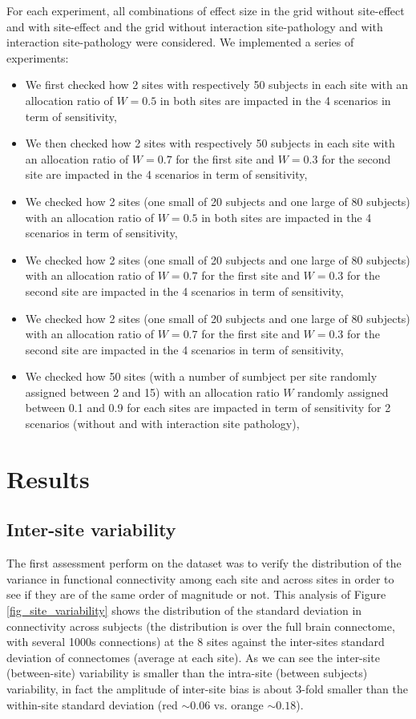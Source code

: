 \documentclass[authoryear]{elsarticle}
\begin{document}
For each experiment, all combinations of effect size in
the grid {without site-effect and with site-effect} and the grid {without interaction site-pathology and with interaction site-pathology} were considered. We implemented a series of experiments:

\begin{itemize}
  \item We first checked how 2 sites with respectively 50 subjects in each site with an allocation ratio of $W=0.5$ in both sites are impacted in the 4 scenarios in term of sensitivity,
  \item We then checked how 2 sites with respectively 50 subjects in each site with an allocation ratio of $W=0.7$ for the first site and $W=0.3$ for the second site are impacted in the 4 scenarios in term of sensitivity,
  \item We checked how 2 sites (one small of 20 subjects and one large of 80 subjects) with an allocation ratio of $W=0.5$ in both sites are impacted in the 4 scenarios in term of sensitivity,
  \item We checked how 2 sites (one small of 20 subjects and one large of 80 subjects) with an allocation ratio of $W=0.7$ for the first site and $W=0.3$ for the second site are impacted in the 4 scenarios in term of sensitivity,
   \item We checked how 2 sites (one small of 20 subjects and one large of 80 subjects) with an allocation ratio of $W=0.7$ for the first site and $W=0.3$ for the second site are impacted in the 4 scenarios in term of sensitivity,
   \item We checked how 50 sites (with a number of sumbject per site randomly assigned between 2 and 15) with an allocation ratio $W$ randomly assigned between 0.1 and 0.9 for each sites are impacted in term of sensitivity for 2 scenarios (without and with interaction site pathology),
\end{itemize}
 
 
\section{Results}

\subsection{Inter-site variability}
The first assessment perform on the dataset was to verify the distribution of the variance in functional connectivity among each site and across sites in order to see if they are of the same order of magnitude or not. This analysis of Figure \ref{fig_site_variability} shows the distribution of the standard deviation in connectivity across subjects (the distribution is over the full brain connectome, with several 1000s connections) at the 8 sites against the inter-sites standard deviation of connectomes (average at each site). As we can see the inter-site (between-site) variability is smaller than the intra-site (between subjects) variability, in fact the amplitude of inter-site bias is about 3-fold smaller than the within-site standard deviation (red $\sim 0.06$ vs. orange $\sim 0.18$).
\end{document}

